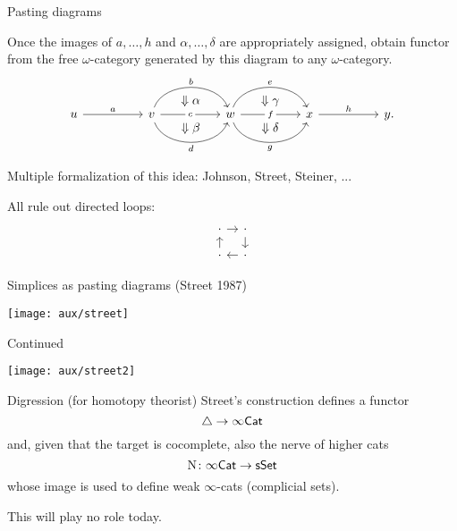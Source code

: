 \begin{frame}[fragile]{Pasting diagrams}
	\pause

	Once the images of $a,\dots,h$ and $\alpha,\dots,\delta$ are appropriately assigned, obtain functor from the free $\omega$-category generated by this diagram to any $\omega$-category.
	\[
	\begin{tikzcd}[ampersand replacement = \&]
		u \arrow[rr,"a"] \& \& v \arrow[rr,"c"{description},""{auto = false,name = c}]
		\arrow[rr,out = 70,in = 110,"b",""{auto = false,name = b}]
		\arrow[rr,out = -70,in = -110,"d"',""{auto = false,name = p}]
		\arrow[phantom,"\Downarrow \alpha",from = b,to = c]
		\arrow[phantom,"\Downarrow \beta",from = c,to = p]
		\& \& w \arrow[rr,"f"{description},""{auto = false,name = f}] \arrow[rr,out = 70,in = 110,"e",""{auto = false,name = e}]
		\arrow[rr,out = -70,in = -110,"g"',""{auto = false,name = g}] \& \& x \arrow[rr,"h",""{auto = false,name = h}] \& \& y.
		\arrow[phantom,"\Downarrow \gamma",from = e,to = f]
		\arrow[phantom,"\Downarrow \delta",from = f,to = g]
	\end{tikzcd}
	\]

	\pause\medskip Multiple formalization of this idea: Johnson, Street, Steiner, ...

	\pause\medskip All rule out directed loops:
	\[
	\begin{tikzcd}[column sep=9pt,row sep=9pt]
		\arrow[d,<-] \arrow[r] \cdot & \arrow[d] \cdot \\
		\arrow[r,,<-] \cdot & \cdot
	\end{tikzcd}
	\]
\end{frame}

\begin{frame}{Simplices as pasting diagrams (Street 1987)}
	\pause
	\begin{center}
		\texttt{[image: aux/street]}
	\end{center}
\end{frame}

\begin{frame}{Continued}
	\vspace*{-10pt}
	\begin{center}
		\texttt{[image: aux/street2]}
	\end{center}
\end{frame}

\begin{frame}{Digression (for homotopy theorist)}
	\pause
	Street's construction defines a functor
	\[
	\triangle \to \infty\mathsf{Cat}
	\]
	\pause
	and, given that the target is cocomplete, also the nerve of higher cats
	\[
	\mathrm{N} \colon \infty\mathsf{Cat} \to \mathsf{sSet}
	\]
	whose image is used to define weak $\infty$-cats (complicial sets).

	\pause\bigskip
	 This will play no role today.
\end{frame}

